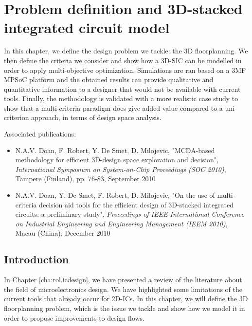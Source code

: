 \chapter{Problem definition and 3D-stacked integrated circuit model}
\label{cha:model}

\begin{summary}
In this chapter, we define the design problem we tackle: the 3D floorplanning. We then define the criteria we consider and show how a 3D-SIC can be modelled in order to apply multi-objective optimization. Simulations are ran based on a 3MF MPSoC platform and the obtained results can provide qualitative and quantitative information to a designer that would not be available with current tools. Finally, the methodology is validated with a more realistic case study to show that a multi-criteria paradigm does give added value compared to a uni-criterion approach, in terms of design space analysis.
\end{summary}

Associated publications:
\begin{itemize}
\item N.A.V. Doan, F. Robert, Y. De Smet, D. Milojevic, "MCDA-based methodology for efficient 3D-design space exploration and decision", \textit{International Symposium on System-on-Chip Proceedings (SOC 2010)}, Tampere (Finland), pp. 76-83, September 2010
\item N.A.V. Doan, Y. De Smet, F. Robert, D. Milojevic, "On the use of multi-criteria decision aid tools for the efficient design of 3D-stacked integrated circuits: a preliminary study", \textit{Proceedings of IEEE International Conference on Industrial Engineering and Engineering Management (IEEM 2010)}, Macau (China), December 2010
\end{itemize}

\section{Introduction}
In Chapter \ref{cha:rol.icdesign}, we have presented a review of the literature about the field of microelectronics design. We have highlighted some limitations of the current tools that already occur for 2D-ICs. In this chapter, we will define the 3D floorplanning problem, which is the issue we tackle and show how we model it in order to propose improvements to design flows.


